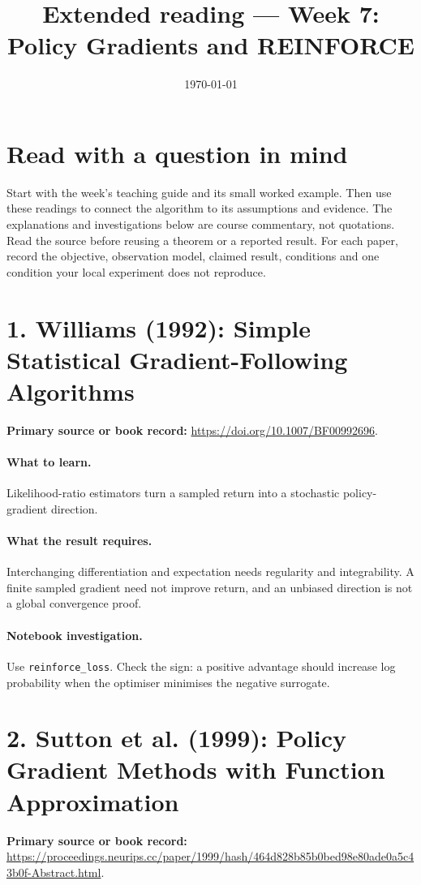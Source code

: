 \documentclass[11pt]{scrartcl}
\title{Extended reading --- Week 7: Policy Gradients and REINFORCE}
\date{\today}
\begin{document}
\maketitle
\section*{Read with a question in mind}
Start with the week's teaching guide and its small worked example. Then use
these readings to connect the algorithm to its assumptions and evidence.
The explanations and investigations below are course commentary, not
quotations. Read the source before reusing a theorem or a reported result.
For each paper, record the objective, observation model, claimed result,
conditions and one condition your local experiment does not reproduce.

\section*{1. Williams (1992): Simple Statistical Gradient-Following Algorithms}
\textbf{Primary source or book record:} \url{https://doi.org/10.1007/BF00992696}.

\paragraph{What to learn.} Likelihood-ratio estimators turn a sampled return into a stochastic policy-gradient direction.

\paragraph{What the result requires.} Interchanging differentiation and expectation needs regularity and integrability. A finite sampled gradient need not improve return, and an unbiased direction is not a global convergence proof.

\paragraph{Notebook investigation.} Use \texttt{reinforce\_loss}. Check the sign: a positive advantage should increase log probability when the optimiser minimises the negative surrogate.

\section*{2. Sutton et al. (1999): Policy Gradient Methods with Function Approximation}
\textbf{Primary source or book record:} \url{https://proceedings.neurips.cc/paper/1999/hash/464d828b85b0bed98e80ade0a5c43b0f-Abstract.html}.
\end{document}
